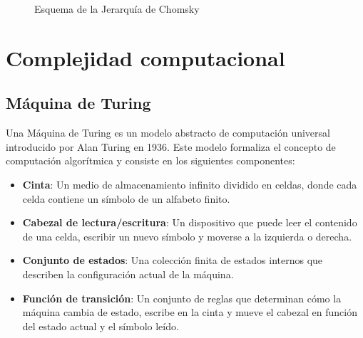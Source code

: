 \documentclass{article}
\begin{document}
\begin{figure}
      \centering
      \caption{Esquema de la Jerarquía de Chomsky}
      \label{fig:ChomskySchema} %
\end{figure}

\section{Complejidad computacional}

\subsection{Máquina de Turing}

Una Máquina de Turing es un modelo abstracto de computación universal introducido por Alan Turing en 1936. Este modelo formaliza el concepto de computación algorítmica y consiste en los siguientes componentes:

\begin{itemize}
      \item \textbf{Cinta}: Un medio de almacenamiento infinito dividido en celdas, donde cada celda contiene un símbolo de un alfabeto finito.
      \item \textbf{Cabezal de lectura/escritura}: Un dispositivo que puede leer el contenido de una celda, escribir un nuevo símbolo y moverse a la izquierda o derecha.
      \item \textbf{Conjunto de estados}: Una colección finita de estados internos que describen la configuración actual de la máquina.
      \item \textbf{Función de transición}: Un conjunto de reglas que determinan cómo la máquina cambia de estado, escribe en la cinta y mueve el cabezal en función del estado actual y el símbolo leído.
\end{itemize}
\end{document}
